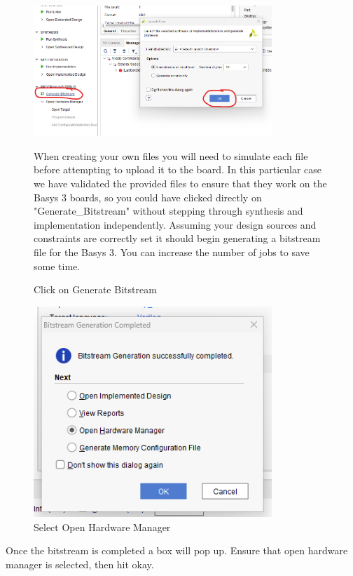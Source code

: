 \ifpdf

    \vspace{1cm}
    \begin{figure}[H]
        \centering
        \includegraphics[width=9cm]{Images/CreateBitstreamImages/Vivado_GenerateBitstream.png}
        \caption{Click on Generate Bitstream}
        \label{fig:enter-label}
        \raggedright
        \vspace{0.5cm}
        When creating your own files you will need to simulate each file before attempting to upload it to the board. In this particular case we have validated the provided files to ensure that they work on the Basys 3 boards, so you could have clicked directly on "Generate\_Bitstream" without stepping through synthesis and implementation independently. Assuming your design sources and constraints are correctly set it should begin generating a bitstream file for the Basys 3. You can increase the number of jobs to save some time. 

    \end{figure}

    \begin{figure}[H]
        \centering
        \includegraphics[width=9cm]{Images/CreateBitstreamImages/Vivado_BitstreamGenerated.png}
        \caption{Select Open Hardware Manager}
        \label{fig:enter-label}
    \end{figure}
    Once the bitstream is completed a box will pop up. Ensure that open hardware manager is selected, then hit okay.

